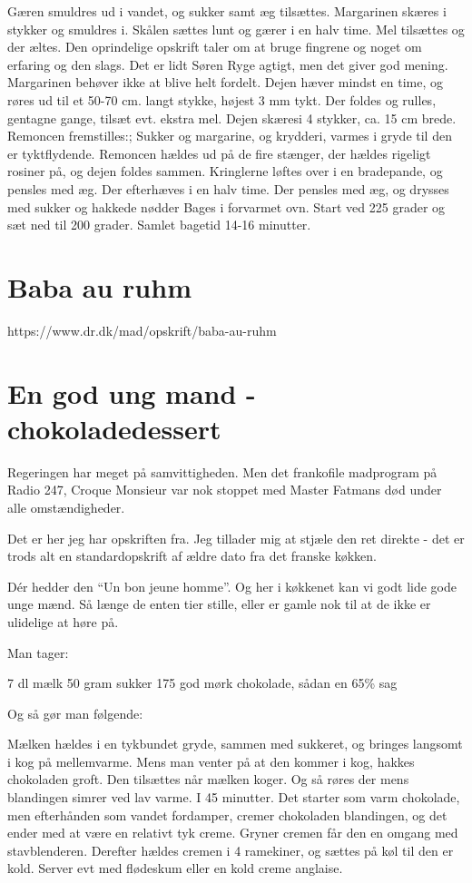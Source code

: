 \documentclass[
  letterpaper,
  DIV=11,
  numbers=noendperiod]{scrreprt}
\begin{document}
Gæren smuldres ud i vandet, og sukker samt æg tilsættes. Margarinen
skæres i stykker og smuldres i. Skålen sættes lunt og gærer i en halv
time. Mel tilsættes og der æltes. Den oprindelige opskrift taler om at
bruge fingrene og noget om erfaring og den slags. Det er lidt Søren Ryge
agtigt, men det giver god mening. Margarinen behøver ikke at blive helt
fordelt. Dejen hæver mindst en time, og røres ud til et 50-70 cm. langt
stykke, højest 3 mm tykt. Der foldes og rulles, gentagne gange, tilsæt
evt. ekstra mel. Dejen skæresi 4 stykker, ca. 15 cm brede. Remoncen
fremstilles:; Sukker og margarine, og krydderi, varmes i gryde til den
er tyktflydende. Remoncen hældes ud på de fire stænger, der hældes
rigeligt rosiner på, og dejen foldes sammen. Kringlerne løftes over i en
bradepande, og pensles med æg. Der efterhæves i en halv time. Der
pensles med æg, og drysses med sukker og hakkede nødder Bages i
forvarmet ovn. Start ved 225 grader og sæt ned til 200 grader. Samlet
bagetid 14-16 minutter.

\hypertarget{baba-au-ruhm-1}{%
\section{Baba au ruhm}\label{baba-au-ruhm-1}}

https://www.dr.dk/mad/opskrift/baba-au-ruhm

\hypertarget{en-god-ung-mand---chokoladedessert-1}{%
\section{En god ung mand -
chokoladedessert}\label{en-god-ung-mand---chokoladedessert-1}}

Regeringen har meget på samvittigheden. Men det frankofile madprogram på
Radio 247, Croque Monsieur var nok stoppet med Master Fatmans død under
alle omstændigheder.

Det er her jeg har opskriften fra. Jeg tillader mig at stjæle den ret
direkte - det er trods alt en standardopskrift af ældre dato fra det
franske køkken.

Dér hedder den ``Un bon jeune homme''. Og her i køkkenet kan vi godt
lide gode unge mænd. Så længe de enten tier stille, eller er gamle nok
til at de ikke er ulidelige at høre på.

Man tager:

7 dl mælk 50 gram sukker 175 god mørk chokolade, sådan en 65\% sag

Og så gør man følgende:

Mælken hældes i en tykbundet gryde, sammen med sukkeret, og bringes
langsomt i kog på mellemvarme. Mens man venter på at den kommer i kog,
hakkes chokoladen groft. Den tilsættes når mælken koger. Og så røres der
mens blandingen simrer ved lav varme. I 45 minutter. Det starter som
varm chokolade, men efterhånden som vandet fordamper, cremer chokoladen
blandingen, og det ender med at være en relativt tyk creme. Gryner
cremen får den en omgang med stavblenderen. Derefter hældes cremen i 4
ramekiner, og sættes på køl til den er kold. Server evt med flødeskum
eller en kold creme anglaise.
\end{document}
